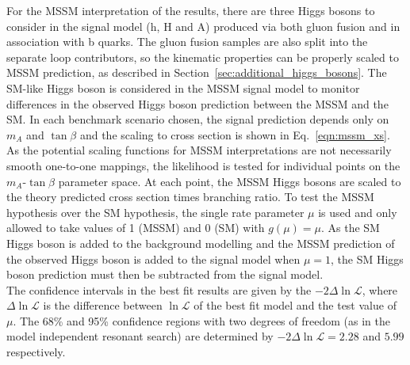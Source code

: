 For the MSSM interpretation of the results, there are three Higgs bosons to consider in the signal model (h, H and A) produced via both gluon fusion and in association with b quarks.
The gluon fusion samples are also split into the separate loop contributors, so the kinematic properties can be properly scaled to MSSM prediction, as described in Section~\ref{sec:additional_higgs_bosons}.
The SM-like Higgs boson is considered in the MSSM signal model to monitor differences in the observed Higgs boson prediction between the MSSM and the SM.
In each benchmark scenario chosen, the signal prediction depends only on $m_{A}$ and $\tan\beta$ and the scaling to cross section is shown in Eq.~\ref{eqn:mssm_xs}.
As the potential scaling functions for MSSM interpretations are not necessarily smooth one-to-one mappings, the likelihood is tested for individual points on the $m_{A}$-$\tan\beta$ parameter space.
At each point, the MSSM Higgs bosons are scaled to the theory predicted cross section times branching ratio.
To test the MSSM hypothesis over the SM hypothesis, the single rate parameter $\mu$ is used and only allowed to take values of 1 (MSSM) and 0 (SM) with $g(\mu)=\mu$.
As the SM Higgs boson is added to the background modelling and the MSSM prediction of the observed Higgs boson is added to the signal model when $\mu=1$, the SM Higgs boson prediction must then be subtracted from the signal model. \\

The confidence intervals in the best fit results are given by the $-2\Delta\ln\mathcal{L}$, where $\Delta\ln\mathcal{L}$ is the difference between $\ln\mathcal{L}$ of the best fit model and the test value of $\mu$. 
The 68\% and 95\% confidence regions with two degrees of freedom (as in the model independent resonant search) are determined by $-2\Delta\ln\mathcal{L} = 2.28$ and $5.99$ respectively. \\

